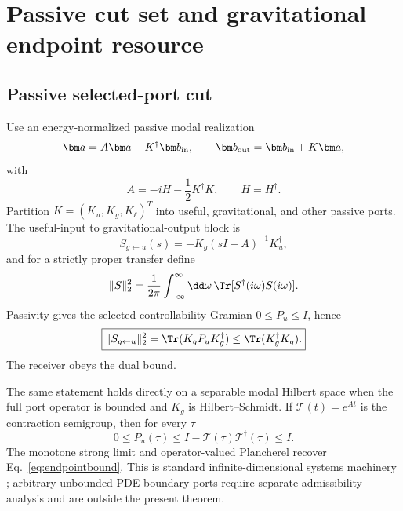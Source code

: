 \section{Passive cut set and gravitational endpoint resource}
\label{sec:networkmaterial}

\subsection{Passive selected-port cut}

Use an energy-normalized passive modal realization
\begin{equation}
\dot{\bm a}=A\bm a-K^\dagger\bm b_{\rm in},
\qquad
\bm b_{\rm out}=\bm b_{\rm in}+K\bm a,
\label{eq:passiveio}
\end{equation}
with
\begin{equation}
\boxed{A=-iH-\frac12K^\dagger K,\qquad H=H^\dagger.}
\label{eq:Apassive}
\end{equation}
Partition $K=(K_u,K_g,K_\ell)^T$ into useful, gravitational, and other passive ports. The useful-input to gravitational-output block is
\begin{equation}
S_{g\leftarrow u}(s)=-K_g(sI-A)^{-1}K_u^\dagger,
\label{eq:Sgu}
\end{equation}
and for a strictly proper transfer define
\begin{equation}
\|S\|_2^2
=\frac1{2\pi}\int_{-\infty}^{\infty}\dd\omega\,
\Tr[S^\dagger(i\omega)S(i\omega)].
\label{eq:H2def}
\end{equation}
Passivity gives the selected controllability Gramian $0\le P_u\le I$, hence \cite{GutaYamamoto2014,TechakesariNurdin2017}
\begin{equation}
\boxed{
\|S_{g\leftarrow u}\|_2^2
=\Tr(K_gP_uK_g^\dagger)
\le\Tr(K_g^\dagger K_g).}
\label{eq:endpointbound}
\end{equation}
The receiver obeys the dual bound.

The same statement holds directly on a separable modal Hilbert space when the full port operator is bounded and $K_g$ is Hilbert--Schmidt. If $\mathcal T(t)=e^{At}$ is the contraction semigroup, then for every $\tau$
\begin{equation}
0\le P_u(\tau)
\le I-\mathcal T(\tau)\mathcal T^\dagger(\tau)
\le I.
\label{eq:infgramian}
\end{equation}
The monotone strong limit and operator-valued Plancherel recover Eq.~\eqref{eq:endpointbound}. This is standard infinite-dimensional systems machinery \cite{BarasBrockett1975,OpmeerReisWollner2013}; arbitrary unbounded PDE boundary ports require separate admissibility analysis and are outside the present theorem.

